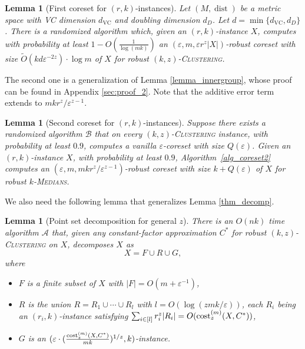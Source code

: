 \documentclass[11pt,letterpaper]{article}
\newtheorem{lemma}[theorem]{Lemma}
\theoremstyle{definition}
\newcommand{\eps}{\varepsilon}
\newcommand{\ProblemName}[1]{\textsc{#1}}
\newcommand{\kzC}{\ProblemName{$(k, z)$-Clustering}\xspace}
\newcommand{\kMedian}{\ProblemName{$k$-Medians}\xspace}
\DeclareMathOperator{\dist}{dist}
\begin{document}
\begin{lemma}[First coreset for $(r,k)$-instances] 
\label{lemma_mainring_kzC}
Let $(M,\dist)$ be a metric space with VC dimension $d_{\mathrm{VC}}$ and doubling dimension $d_D$.
%
Let $d = \min\{d_{\mathrm{VC}}, d_D\}$.
%
There is a randomized algorithm which, given an $(r,k)$-instance $X$, computes with probability at least $1- O(\frac{1}{\log (mk)})
	$  an $(\eps,m,\eps r^z |X| )$-robust coreset with size $\tilde{O}(kd\eps^{-2z})\cdot \log m$ of $X$ for robust \kzC.
\end{lemma}

The second one is a generalization of Lemma \ref{lemma_innergroup}, whose proof can be found in Appendix \ref{sec:proof_2}.
%
Note that the additive error term extends to \( mkr^z/\eps^{z-1} \).

\begin{lemma}[Second coreset for $(r,k)$-instances] 
\label{lemma_innergroup_kzC} 
Suppose there exists a randomized algorithm $\mathcal{B}$ that on every \kzC instance, with probability at least $0.9$, computes a vanilla $\eps$-coreset with size $Q(\eps)$.
Given an $(r,k)$-instance $X$, with probability at least $0.9$, Algorithm~\ref{alg_coreset2} computes an $(\eps,m,mkr^z/\eps^{z-1})$-robust coreset with size $k+Q(\eps)$ of $X$ for robust \kMedian.
\end{lemma}

We also need the following lemma that generalizes Lemma \ref{thm_decomp}.

\begin{lemma}[Point set decomposition for general $z$] 
\label{thm_decomp_kzC}
	There is an $O(nk)$ time algorithm $\mathcal{A}$ that, given any constant-factor approximation $C^\ast$ for robust \kzC on $X$, decomposes $X$ as
	\[
		X=F\cup R\cup G,
	\]
	where
	\begin{itemize}[itemsep=0pt,topsep=0pt]
	\item $F$ is a finite subset of $X$ with $|F| = O(m+\eps^{-1})$, 
	\item $R$ is the union $R=R_1\cup\cdots\cup R_l$ with $l = O(\log (zmk/\eps))$, each $R_i$ being an $(r_i,k)$-instance satisfying $\sum_{i\in [l]} r_i^z|R_i| = O(\cost_z^{(m)}(X,C^\ast))$, 
	\item $G$ is an $(\eps \cdot (\frac{\cost_z^{(m)}(X,C^\ast)}{mk})^{1/z}, k)$-instance.
	\end{itemize}
\end{lemma}
\end{document}
